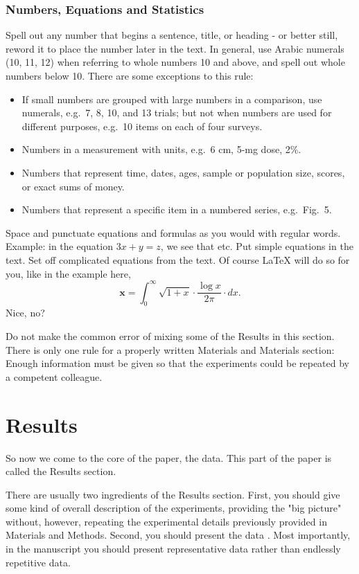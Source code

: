 \documentclass[a4paper]{article}
\def\x{{\mathbf x}}
\begin{document}
\subsubsection{Numbers, Equations and Statistics}
Spell out any number that begins a sentence, title, or heading - or better still, reword it to place the number later in the text. In general, use Arabic numerals (10, 11, 12) when referring to whole numbers 10 and above, and spell out whole numbers below 10. There are some exceptions to this rule:
\begin{itemize}
	\item If small numbers are grouped with large numbers in a comparison, use numerals, e.g.~7, 8, 10, and 13 trials; but not when numbers are used for different purposes, e.g.~10 items on each of four surveys.
	\item Numbers in a measurement with units, e.g.~6 cm, 5-mg dose, 2\%.
	\item Numbers that represent time, dates, ages, sample or population size, scores, or exact sums of money.
	\item Numbers that represent a specific item in a numbered series, e.g.~Fig.~5.
\end{itemize}

\noindent Space and punctuate equations and formulas as you would with regular words. Example: in the equation $3x + y = z$, we see that etc. Put simple equations in the text. Set off complicated equations from the text. Of course LaTeX will do so for you, like in the example here,
\begin{equation}
\x = \int_0^\infty \sqrt{1+x}\cdot\frac{\log x}{2\pi}\cdot dx.
\end{equation}
Nice, no?

Do not make the common error of mixing some of the Results in this section. There is only one rule for a properly written Materials and Materials section: Enough information must be given so that the experiments could be repeated by a competent colleague.

\section{Results}
\label{sec:results}

So now we come to the core of the paper, the data. This part of the paper is called the Results section.

There are usually two ingredients of the Results section. First, you should give some kind of overall description of the experiments, providing the "big picture" without, however, repeating the experimental details previously provided in Materials and Methods. Second, you should present the data . Most importantly, in the manuscript you should present representative data rather than endlessly repetitive data.
 
\end{document}
